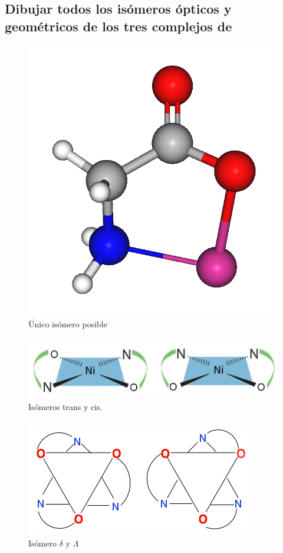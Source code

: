 \documentclass[fleqn,10pt]{SelfArx} %
\begin{document}
	\subsection{Dibujar todos los is\'omeros \'opticos y geom\'etricos de los tres complejos de}
	\subsubsection{\ce{[Ni(Gly^-)]^+}}
	\begin{figure}[h]
		\centering
		\includegraphics[width = 0.4\linewidth]{images/Single.png}
		\caption{\'Unico is\'omero posible}
	\end{figure}
	
	\subsubsection{\ce{[Ni(Gly^-)_2]}}
	\begin{figure}[h]
		\centering
		\includegraphics[width = \linewidth]{images/cis_trans.jpg}
		\caption{Is\'omeros trans y cis.}
	\end{figure}
	
	\subsubsection{\ce{[Ni(Gly^-)_3]^-}}
	\begin{figure}[h]
		\centering
		\includegraphics[width = \linewidth]{images/delta_lambda.png}
		\caption{Is\'omero $\delta$ y $\Lambda$}
	\end{figure}
	
\end{document}

